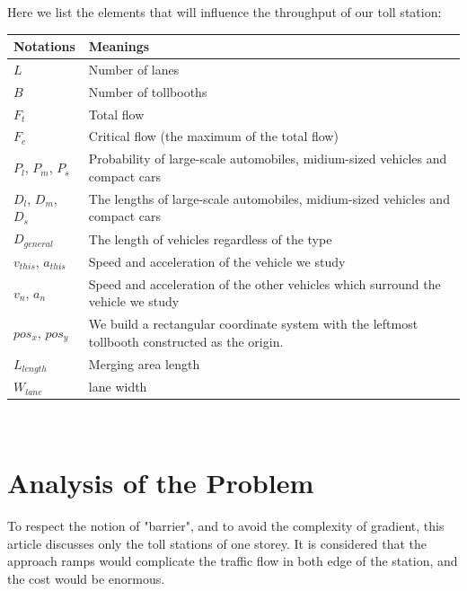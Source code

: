 \documentclass{mcmthesis}
\begin{document}
Here we list the elements that will influence the throughput of our toll station:
\begin{table}[h]
\centering
   \begin{tabular}{|m{7cm}<{\centering}|p{7cm}<{\centering}|}
   	
   	\hline
   	Notations & Meanings \\
   	\hline
   	$L$ &  Number of lanes \\
   	\hline
   	$B$ &  Number of tollbooths\\
   	\hline
   	$F_t$ & 	 Total flow\\
   	\hline
   	$F_c$ & Critical flow (the maximum of the total flow)\\
   	\hline
   	$P_l$,  $P_m$, $P_s$ & Probability of large-scale automobiles, midium-sized vehicles and compact cars\\
   	\hline
   	$D_l$, $D_m$, $D_s$ & The lengths of large-scale automobiles, midium-sized vehicles and compact cars\\
   	\hline
   	$D_{general}$ & The length of vehicles regardless of the type\\
   	\hline
   	$v_{this}$, $a_{this}$ & Speed and acceleration of the vehicle we study\\
   	\hline
   	$v_n$, $a_n$ &  Speed and acceleration of the other vehicles which surround the vehicle we study\\
   	\hline
   	$pos_x$, $pos_y$ & We build a rectangular coordinate system  with the leftmost tollbooth constructed as the origin.\\
   	\hline
   	$L_{length}$ & Merging area length \\
   	\hline
   	$W_{lane}$ & lane width \\
   	\hline

   \end{tabular}
\end{table}\\





\section{Analysis of the Problem}
To respect the notion of "barrier", and to avoid the complexity of gradient, this article discusses only the toll stations of one storey. It is considered that the approach ramps would complicate the traffic flow in both edge of the station, and the cost would be enormous.
\end{document}
